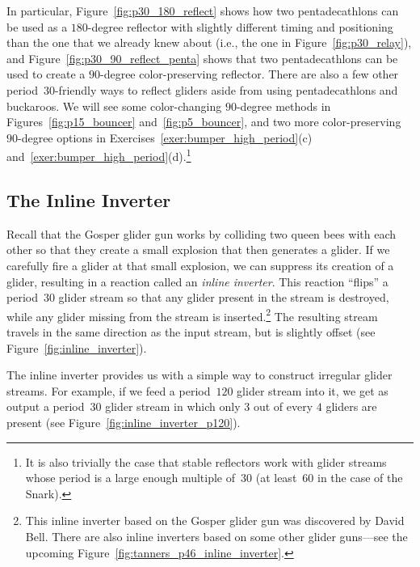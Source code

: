 In particular, Figure~\ref{fig:p30_180_reflect} shows how two pentadecathlons can be used as a $180$-degree reflector with slightly different timing and positioning than the one that we already knew about (i.e., the one in Figure~\ref{fig:p30_relay}), and Figure~\ref{fig:p30_90_reflect_penta} shows that two pentadecathlons can be used to create a $90$-degree color-preserving reflector. There are also a few other period~$30$-friendly ways to reflect gliders aside from using pentadecathlons and buckaroos. We will see some color-changing $90$-degree methods in Figures~\ref{fig:p15_bouncer} and~\ref{fig:p5_bouncer}, and two more color-preserving $90$-degree options in Exercises~\ref{exer:bumper_high_period}(c) and~\ref{exer:bumper_high_period}(d).\footnote{It is also trivially the case that stable reflectors work with glider streams whose period is a large enough multiple of~$30$ (at least~$60$ in the case of the Snark).} 


\subsection{The Inline Inverter}\label{sec:p30_inline_inverter}

Recall that the Gosper glider gun works by colliding two queen bees with each other so that they create a small explosion that then generates a glider. If we carefully fire a glider at that small explosion, we can suppress its creation of a glider, resulting in a reaction called an \emph{inline inverter}. This reaction ``flips'' a period~$30$ glider stream so that any glider present in the stream is destroyed, while any glider missing from the stream is inserted.\footnote{This inline inverter based on the Gosper glider gun was discovered by David Bell. There are also inline inverters based on some other glider guns---see the upcoming Figure~\ref{fig:tanners_p46_inline_inverter}.} The resulting stream travels in the same direction as the input stream, but is slightly offset (see Figure~\ref{fig:inline_inverter}).

The inline inverter provides us with a simple way to construct irregular glider streams. For example, if we feed a period~$120$ glider stream into it, we get as output a period~$30$ glider stream in which only $3$ out of every $4$ gliders are present (see Figure~\ref{fig:inline_inverter_p120}).

